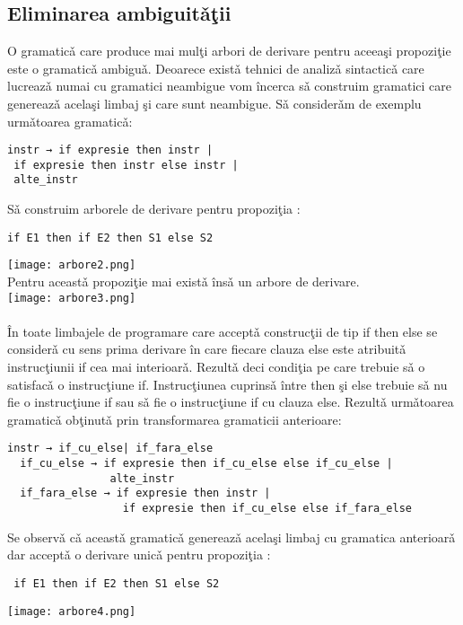 \subsection{Eliminarea ambiguit\v a\c tii}
O gramatic\v a care produce mai mul\c ti arbori de derivare pentru aceea\c si propozi\c tie este o gramatic\v a 
ambigu\v a. Deoarece exist\v a tehnici de analiz\v a sintactic\v a care lucreaz\v a numai cu gramatici neambigue vom \^ incerca s\v a construim gramatici care genereaz\v a acela\c si limbaj \c si care sunt neambigue.  S\v a consider\v am de exemplu urm\v atoarea gramatic\v a: 
\begin{verbatim}
instr → if expresie then instr | 
 if expresie then instr else instr |
 alte_instr 
\end{verbatim}
S\v a construim arborele de derivare pentru propozi\c tia : 
\begin{verbatim}
if E1 then if E2 then S1 else S2
\end{verbatim}

\texttt{[image: arbore2.png]}
\\
Pentru aceast\v a propozi\c tie mai exist\v a \^ins\v a un arbore de derivare.
\\
\texttt{[image: arbore3.png]}

\paragraph*{}
\^In toate limbajele de programare care accept\v a construc\c tii de tip if then else se consider\v a cu sens prima derivare \^ in care fiecare clauza else este atribuit\v a instruc\c tiunii if cea mai interioar\v a. Rezult\v a deci condi\c tia pe care trebuie s\v a o satisfac\v a o instruc\c tiune if. Instruc\c tiunea cuprins\v a \^ intre then \c si else trebuie s\v a nu fie o instruc\c tiune if sau s\v a fie o instruc\c tiune if cu clauza else. Rezult\v a urm\v atoarea gramatic\v a ob\c tinut\v a prin
transformarea gramaticii anterioare: 
\begin{verbatim}
instr → if_cu_else| if_fara_else                               
  if_cu_else → if expresie then if_cu_else else if_cu_else |      
                alte_instr                                        
  if_fara_else → if expresie then instr |                         
                  if expresie then if_cu_else else if_fara_else 
\end{verbatim}

Se observ\v a c\v a aceast\v a gramatic\v a genereaz\v a acela\c si limbaj cu gramatica anterioar\v a dar accept\v a o derivare unic\v a pentru propozi\c tia : 
\begin{verbatim}
 if E1 then if E2 then S1 else S2 
\end{verbatim}
\texttt{[image: arbore4.png]}

